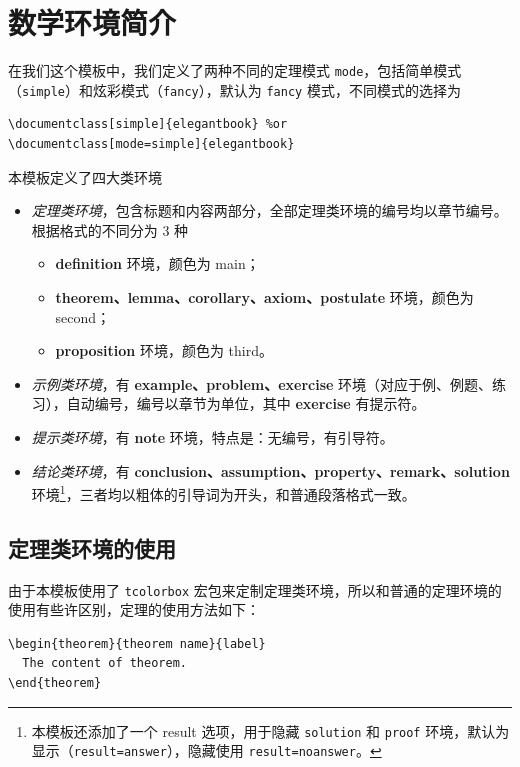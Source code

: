 \documentclass[lang=cn,10pt,cite=super]{elegantbook}
\begin{document}
\section{数学环境简介}

在我们这个模板中，我们定义了两种不同的定理模式 \lstinline{mode}，包括简单模式（\lstinline{simple}）和炫彩模式（\lstinline{fancy}），默认为 \lstinline{fancy} 模式，不同模式的选择为
\begin{lstlisting}
\documentclass[simple]{elegantbook} %or
\documentclass[mode=simple]{elegantbook}
\end{lstlisting}

本模板定义了四大类环境

\begin{itemize}
  \item \textit{定理类环境}，包含标题和内容两部分，全部定理类环境的编号均以章节编号。根据格式的不同分为 3 种
    \begin{itemize}
      \item \textcolor{main}{\textbf{definition}} 环境，颜色为 \textcolor{main}{main}；
      \item \textcolor{second}{\textbf{theorem、lemma、corollary、axiom、postulate}} 环境，颜色为 \textcolor{second} {second}；
      \item \textcolor{third}{\textbf{proposition}} 环境，颜色为 \textcolor{third}{third}。
    \end{itemize}
  \item \textit{示例类环境}，有 \textbf{example、problem、exercise} 环境（对应于例、例题、练习），自动编号，编号以章节为单位，其中 \textbf{exercise} 有提示符。
  \item \textit{提示类环境}，有 \textbf{note} 环境，特点是：无编号，有引导符。
  \item \textit{结论类环境}，有 \textbf{conclusion、assumption、property、remark、solution} 环境\footnote{本模板还添加了一个 result 选项，用于隐藏 \lstinline{solution} 和 \lstinline{proof} 环境，默认为显示（\lstinline{result=answer}），隐藏使用 \lstinline{result=noanswer}。}，三者均以粗体的引导词为开头，和普通段落格式一致。
\end{itemize}

\subsection{定理类环境的使用}

由于本模板使用了 \lstinline{tcolorbox} 宏包来定制定理类环境，所以和普通的定理环境的使用有些许区别，定理的使用方法如下：
\begin{lstlisting}
\begin{theorem}{theorem name}{label}
  The content of theorem.
\end{theorem}
\end{lstlisting}
\end{document}
